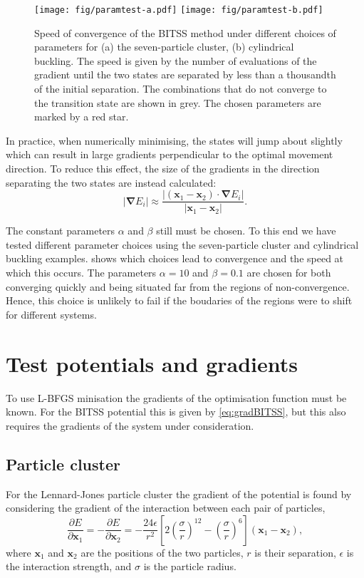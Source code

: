 \documentclass[aps,prl]{revtex4}
\newcommand{\abs}[1]{\left| #1 \right|}
\newcommand{\grad}{\bm{\nabla}}
\begin{document}
\begin{figure}[b]
  \texttt{[image: fig/paramtest-a.pdf]}%
  \texttt{[image: fig/paramtest-b.pdf]}%
  \caption{\label{fig:paramtest}
    Speed of convergence of the BITSS method under different choices of parameters for (a) the seven-particle cluster, (b) cylindrical buckling.
    The speed is given by the number of evaluations of the gradient until the two states are separated by less than a thousandth of the initial separation.
    The combinations that do not converge to the transition state are shown in grey. 
    The chosen parameters are marked by a red star.
  }
\end{figure}

In practice, when numerically minimising, the states will jump about slightly which can result in large gradients perpendicular to the optimal movement direction.
To reduce this effect, the size of the gradients in the direction separating the two states are instead calculated:
\begin{equation}
  \abs{\grad E_i} \approx \frac {\abs{(\bm{x}_1 - \bm{x}_2) \cdot \grad E_i}} {\abs{\bm{x}_1 - \bm{x}_2}}.
\end{equation}

The constant parameters $\alpha$ and $\beta$ still must be chosen.
To this end we have tested different parameter choices using the seven-particle cluster and cylindrical buckling examples.
 shows which choices lead to convergence and the speed at which this occurs.
The parameters $\alpha = 10$ and $\beta = 0.1$ are chosen for both converging quickly and being situated far from the regions of non-convergence.
Hence, this choice is unlikely to fail if the boudaries of the regions were to shift for different systems.


\section{Test potentials and gradients}
To use L-BFGS minisation the gradients of the optimisation function must be known.
For the BITSS potential this is given by \cref{eq:gradBITSS}, but this also requires the gradients of the system under consideration.

\subsection{Particle cluster}
For the Lennard-Jones particle cluster the gradient of the potential is found by considering the gradient of the interaction between each pair of particles,
\begin{equation}
  \frac{\partial E}{\partial \bm{x}_1} = -\frac{\partial E}{\partial \bm{x}_2} = - \frac{24 \epsilon}{r^2}
    \left[ 2 \left(\frac{\sigma}{r}\right)^{12} - \left(\frac{\sigma}{r}\right)^6 \right] (\bm{x}_1 - \bm{x}_2),
\end{equation}
where $\bm{x}_1$ and $\bm{x}_2$ are the positions of the two particles, $r$ is their separation, $\epsilon$ is the interaction strength, and $\sigma$ is the particle radius.
\end{document}
